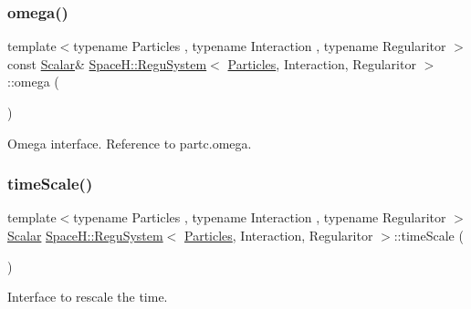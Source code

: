 \subsubsection{\texorpdfstring{omega()}{omega()}}
{\footnotesize\ttfamily template$<$typename Particles , typename Interaction , typename Regularitor $>$ \\
const \mbox{\hyperlink{class_space_h_1_1_regu_system_a6f6c4d4fd030a85621a78b137c0ac889}{Scalar}}\& \mbox{\hyperlink{class_space_h_1_1_regu_system}{Space\+H\+::\+Regu\+System}}$<$ \mbox{\hyperlink{struct_space_h_1_1_particles}{Particles}}, Interaction, Regularitor $>$\+::omega (\begin{DoxyParamCaption}{ }\end{DoxyParamCaption})\hspace{0.3cm}{\ttfamily [inline]}}



Omega interface. Reference to partc.\+omega. 

\mbox{\label{class_space_h_1_1_regu_system_a761c0dab5206189ba9e2abd19b1bce4f}} 
\subsubsection{\texorpdfstring{time\+Scale()}{timeScale()}}
{\footnotesize\ttfamily template$<$typename Particles , typename Interaction , typename Regularitor $>$ \\
\mbox{\hyperlink{class_space_h_1_1_regu_system_a6f6c4d4fd030a85621a78b137c0ac889}{Scalar}} \mbox{\hyperlink{class_space_h_1_1_regu_system}{Space\+H\+::\+Regu\+System}}$<$ \mbox{\hyperlink{struct_space_h_1_1_particles}{Particles}}, Interaction, Regularitor $>$\+::time\+Scale (\begin{DoxyParamCaption}{ }\end{DoxyParamCaption})\hspace{0.3cm}{\ttfamily [inline]}}



Interface to rescale the time. 

